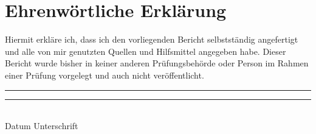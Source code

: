\chapter*{Ehrenwörtliche Erklärung}

Hiermit erkläre ich, dass ich den vorliegenden Bericht selbstständig angefertigt und alle von mir genutzten Quellen und Hilfsmittel angegeben habe. Dieser Bericht wurde bisher in keiner anderen Prüfungsbehörde oder Person im Rahmen einer Prüfung vorgelegt und auch nicht veröffentlicht.

\vspace{5cm}

\rule{3.5cm}{1pt} \hspace{1.5cm} \rule{10cm}{1pt}\\
Datum \hspace{4cm} Unterschrift\\
